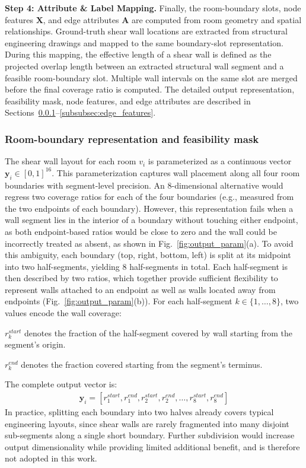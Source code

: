 \textbf{Step 4: Attribute \& Label Mapping.} Finally, the room-boundary slots, node features $\mathbf{X}$, and edge attributes $\mathbf{A}$ are computed from room geometry and spatial relationships. Ground-truth shear wall locations are extracted from structural engineering drawings and mapped to the same boundary-slot representation. During this mapping, the effective length of a shear wall is defined as the projected overlap length between an extracted structural wall segment and a feasible room-boundary slot. Multiple wall intervals on the same slot are merged before the final coverage ratio is computed. The detailed output representation, feasibility mask, node features, and edge attributes are described in Sections~\ref{subsubsec:output_param}--\ref{subsubsec:edge_features}.

\subsubsection{Room-boundary representation and feasibility mask}
\label{subsubsec:output_param}

The shear wall layout for each room $v_i$ is parameterized as a continuous vector $\mathbf{y}_i \in [0,1]^{16}$.
This parameterization captures wall placement along all four room boundaries with segment-level precision.
An 8-dimensional alternative would regress two coverage ratios for each of the four boundaries (e.g., measured from the two endpoints of each boundary).
However, this representation fails when a wall segment lies in the interior of a boundary without touching either endpoint, as both endpoint-based ratios would be close to zero and the wall could be incorrectly treated as absent, as shown in Fig.~\ref{fig:output_param}(a).
To avoid this ambiguity, each boundary (top, right, bottom, left) is split at its midpoint into two half-segments, yielding 8 half-segments in total.
Each half-segment is then described by two ratios, which together provide sufficient flexibility to represent walls attached to an endpoint as well as walls located away from endpoints (Fig.~\ref{fig:output_param}(b)).
For each half-segment $k \in \{1, \ldots, 8\}$, two values encode the wall coverage:

$r_k^{start}$ denotes the fraction of the half-segment covered by wall starting from the segment's origin.

$r_k^{end}$ denotes the fraction covered starting from the segment's terminus.

The complete output vector is:
\begin{align}
\mathbf{y}_i = [r_1^{start}, r_1^{end}, r_2^{start}, r_2^{end}, \ldots, r_8^{start}, r_8^{end}]
\end{align}
In practice, splitting each boundary into two halves already covers typical engineering layouts, since shear walls are rarely fragmented into many disjoint sub-segments along a single short boundary.
Further subdivision would increase output dimensionality while providing limited additional benefit, and is therefore not adopted in this work.

